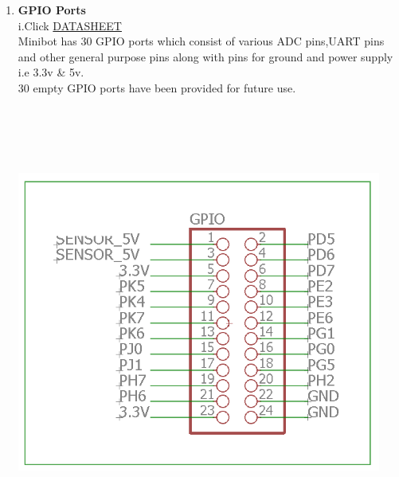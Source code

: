 \documentclass[a4paper,12pt,oneside]{book}
\begin{document}
\begin{enumerate}
    
    \newpage\item \textbf{GPIO Ports}\\
    i.Click \href{https://www.sparkfun.com/datasheets/Sensors/Infrared/gp2y0a02yk_e.pdf}{DATASHEET}
    \\[0.5cm]Minibot has 30 GPIO ports which consist of various ADC pins,UART pins and other general purpose pins along with pins for ground and power supply i.e 3.3v & 5v.
    \\30 empty GPIO ports have been provided for future use.
    \\\hfill\includegraphics[width=12cm, height=15cm]{GPIO}
    

\end{enumerate}
\end{document}
